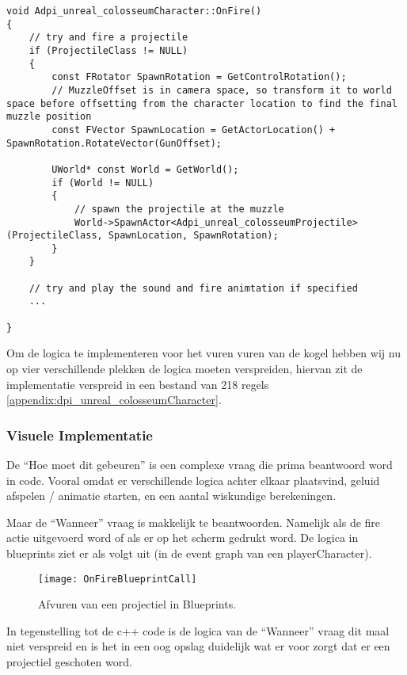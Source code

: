 \begin{lstlisting}[caption=Implementatie van de OnFire functie]
void Adpi_unreal_colosseumCharacter::OnFire()
{ 
	// try and fire a projectile
	if (ProjectileClass != NULL)
	{
		const FRotator SpawnRotation = GetControlRotation();
		// MuzzleOffset is in camera space, so transform it to world space before offsetting from the character location to find the final muzzle position
		const FVector SpawnLocation = GetActorLocation() + SpawnRotation.RotateVector(GunOffset);

		UWorld* const World = GetWorld();
		if (World != NULL)
		{
			// spawn the projectile at the muzzle
			World->SpawnActor<Adpi_unreal_colosseumProjectile>(ProjectileClass, SpawnLocation, SpawnRotation);
		}
	}

	// try and play the sound and fire animtation if specified
	...

}
\end{lstlisting}
Om de logica te implementeren voor het vuren vuren van de kogel hebben wij nu op vier verschillende plekken de logica moeten verspreiden, hiervan zit de implementatie verspreid in een bestand van 218 regels \ref{appendix:dpi_unreal_colosseumCharacter}.

\subsubsection{Visuele Implementatie}
De “Hoe moet dit gebeuren” is een complexe vraag die prima beantwoord word in code. Vooral omdat er verschillende logica achter elkaar plaatsvind, geluid afspelen / animatie starten, en een aantal wiskundige berekeningen. 

Maar de “Wanneer” vraag is makkelijk te beantwoorden. Namelijk als de fire actie uitgevoerd word of als er op het scherm gedrukt word. De logica in blueprints ziet er als volgt uit (in de event graph van een playerCharacter).

\begin{figure}[!ht]
  \centering
    \texttt{[image: OnFireBlueprintCall]}
    \caption{Afvuren van een projectiel in Blueprints.}
\end{figure}

In tegenstelling tot de c++ code is de logica van de “Wanneer” vraag dit maal niet verspreid en is het in een oog opslag duidelijk wat er voor zorgt dat er een projectiel geschoten word.